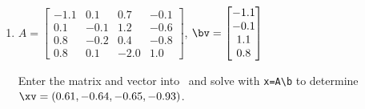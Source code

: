 \begin{example}
\begin{enumerate}
\begin{solution}
\end{solution}


\item \(A=\begin{bmatrix} -1.1&0.1&0.7&-0.1
\\0.1&-0.1&1.2&-0.6
\\0.8&-0.2&0.4&-0.8
\\0.8&0.1&-2.0&1.0 \end{bmatrix}\),
\(\bv=\begin{bmatrix} -1.1
\\-0.1
\\1.1
\\0.8
 \end{bmatrix}\)
\begin{solution} 
Enter the matrix and vector into \script\ and solve with \verb|x=A\b| to determine \(\xv=(0.61,-0.64,-0.65,-0.93)\).
\setbox\ajrqrbox\hbox{}%
\marginpar{\usebox{\ajrqrbox\\[2ex]}}%


\end{solution}
\end{enumerate}
\end{example}
